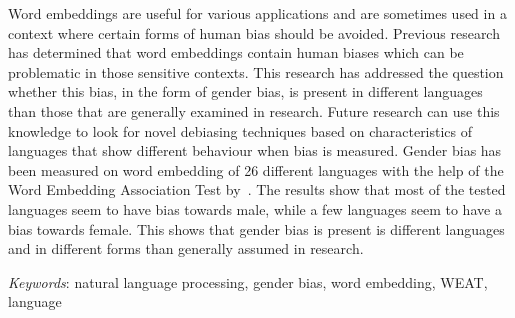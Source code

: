 
Word embeddings are useful for various applications and are sometimes used in a context
where certain forms of human bias should be avoided.
Previous research has determined that word embeddings contain human
biases which can be problematic in those sensitive contexts.
This research has addressed the question whether this bias, in the form of gender
bias, is present in different languages than those that are generally examined in
research.
Future research can use this knowledge to look for novel debiasing techniques based on
characteristics of languages that show different behaviour when bias is measured.
Gender bias has been measured on word embedding of 26 different languages with the help
of the Word Embedding Association Test
by~\textcite{caliskan_2017_semantics_language_corpora}.
The results show that most of the tested languages seem to have bias towards male,
while a few languages seem to have a bias towards female.
This shows that gender bias is present is different languages and in different forms
than generally assumed in research.

\emph{Keywords}: natural language processing, gender bias, word embedding, WEAT, language
